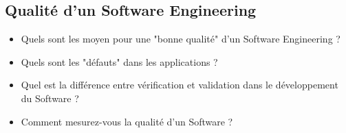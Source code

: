 \subsection{Qualité d'un Software Engineering}


\begin{itemize}
	\item Quels sont les moyen pour une "bonne qualité" d'un Software Engineering ?
	\item Quels sont les "défauts" dans les applications ?
	\item Quel est la différence entre vérification et validation dans le développement du Software ?
	\item Comment mesurez-vous la qualité d'un Software ?
\end{itemize}